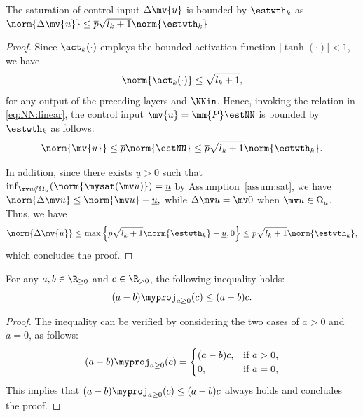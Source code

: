 \documentclass[letterpaper, journal, twoside]{IEEEtran}
\begin{document}
\begin{lem} \label{lem:delta:u:bound}
  The saturation of control input $\Delta\mv{u}$ is bounded by $\estwth_k$ as $\norm{\Delta\mv{u}}\le \overline{p}\sqrt{l_k+1}\norm{\estwth_k}$.
\end{lem}

\begin{proof}
  Since $\act_k(\cdot)$ employs the bounded activation function $\vert\tanh(\cdot)\vert < 1$, we have 
  \begin{equation}
    \norm{\act_k(\cdot)} \le \sqrt{l_k+1}
    ,
  \end{equation}
  for any output of the preceding layers and $\NNin$.
  Hence, invoking the relation in \eqref{eq:NN:linear}, the control input $\mv{u}=\mm{P}\estNN$ is bounded by $\estwth_k$ as follows:
  \begin{equation} \label{eq:NN:bound}
    \norm{\mv{u}} 
    \le
    \overline{p}
    \norm{\estNN}
    \le
    \overline{p}
    \sqrt{l_k+1}\norm{\estwth_k}
    .   
  \end{equation}

  In addition, since there exists $\underline{u}>0$ such that $\inf_{\mv u\notin\Omega_u}\allowbreak(\norm{\mysat(\mv u)})=\underline{u}$ by Assumption~\ref{assum:sat}, we have
  $
    \norm{\Delta\mv u}
    \le
    \norm{\mv u}-\underline{u}
    ,
  $ 
  while $\Delta\mv u=\mv 0$ when $\mv u\in\Omega_u$.
  Thus, we have
  \begin{equation}
    \norm{\Delta\mv{u}}
    \le
    \max
    \left\{
      \overline{p}\sqrt{l_k+1}\norm{\estwth_k}
      -
      \underline{u}
      ,
      0
    \right\}
    \le
    \overline{p}\sqrt{l_k+1}\norm{\estwth_k}
    ,  
  \end{equation}
  which concludes the proof.    
\end{proof}

\begin{lem} \label{lem:proj:ineq}
  For any $a,b\in\R_{\ge0}$ and $c\in\R_{>0}$, the following inequality holds:
  \begin{equation}
    (a-b)\myproj_{a\ge0}(c) \le (a-b) c.
  \end{equation}
\end{lem}

\begin{proof}
  The inequality can be verified by considering the two cases of $a>0$ and $a=0$, as follows:
  \begin{equation*}
    (a-b)\myproj_{a\ge0}(c) 
    =
    \begin{cases}
      (a-b) c, & \text{if } a>0,
      \\
      0, & \text{if } a=0,
    \end{cases}
  \end{equation*}
  This implies that $(a-b)\myproj_{a\ge0}(c) \le (a-b) c$ always holds and concludes the proof.
\end{proof}
\end{document}
